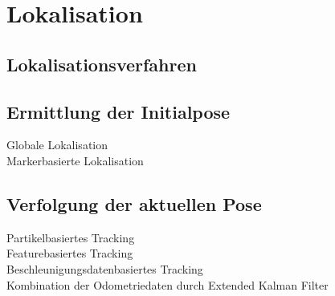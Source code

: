 \chapter{Lokalisation}

\section{Lokalisationsverfahren}

\section{Ermittlung der Initialpose}
Globale Lokalisation\\
Markerbasierte Lokalisation\\

\section{Verfolgung der aktuellen Pose}
Partikelbasiertes Tracking\\
Featurebasiertes Tracking\\
Beschleunigungsdatenbasiertes Tracking\\
Kombination der Odometriedaten durch Extended Kalman Filter\\